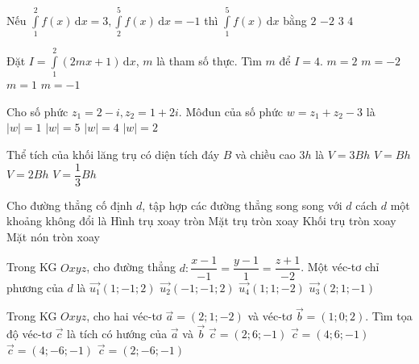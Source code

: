 \begin{ex}%
	Nếu $\displaystyle\int\limits_1^2 f(x)\mathrm{\,d}x=3,\displaystyle\int\limits_2^5 f(x)\mathrm{\,d}x=-1$ thì $\displaystyle\int\limits_1^5 f(x)\mathrm{\,d}x$ bằng
	\choice
	{\True $2$}
	{$-2$}
	{$3$}
	{$4$}
	\loigiai{
	\[\displaystyle\int\limits_1^5 f(x)\mathrm{\,d}x=\displaystyle\int\limits_1^2 f(x)\mathrm{\,d}x+\displaystyle\int\limits_2^5 f(x)\mathrm{\,d}x=3-1=2.\]}
\end{ex}
\begin{ex}%
	Đặt $I=\displaystyle\int\limits_1^2(2mx+1)\mathrm{\,d}x$, $m$ là tham số thực. Tìm $m$ để $I=4$. 
	\choice
	{$m=2$}
	{$m=-2$}
	{\True $m=1$}
	{$m=-1$}
	\loigiai{
	\[I=\displaystyle\int\limits_1^2(2mx+1)\mathrm{\,d}x=\left(mx^2+x\right)\bigg|_1^2 =4m+2-m-1=3m+1 \Rightarrow I=4\Leftrightarrow m=1.\]}
\end{ex}
\begin{ex}%
	Cho số phức $z_1=2-i, z_2=1+2i$. Môđun của số phức $w=z_1+z_2-3$ là
	\choice
	{\True $|w|=1$}
	{$|w|=5$}
	{$|w|=4$}
	{$|w|=2$}
\end{ex}
\begin{ex}%
	Thể tích của khối lăng trụ có diện tích đáy $B$ và chiều cao $3h$ là
	\choice
	{\True $V=3Bh$}
	{$V=Bh$}
	{$V=2Bh$}
	{$V=\dfrac{1}{3}Bh$}
\end{ex}
\begin{ex}%
	Cho đường thẳng cố định $d$, tập hợp các đường thẳng song song với $d$ cách $d$ một khoảng không đổi là
	\choice
	{Hình trụ xoay tròn}
	{\True Mặt trụ tròn xoay}
	{Khối trụ tròn xoay}
	{Mặt nón tròn xoay}
\end{ex}
\begin{ex}%
	Trong KG $Oxyz$, cho đường thẳng $d\colon\dfrac{x-1}{-1}=\dfrac{y-1}{1}=\dfrac{z+1}{-2}$. Một véc-tơ chỉ phương của $d$ là 
	\choice
	{\True $\overrightarrow{u_1}(1;-1; 2)$}
	{$\overrightarrow{u_2}(-1;-1; 2)$}
	{$\overrightarrow{u_4}(1; 1;-2)$}
	{$\overrightarrow{u_3}(2; 1;-1)$}
\end{ex}
\begin{ex}%
	Trong KG $Oxyz$, cho hai véc-tơ $\overrightarrow{a}=(2; 1;-2)$ và véc-tơ $\overrightarrow{b}=(1; 0; 2)$. Tìm tọa độ véc-tơ $\overrightarrow{c}$ là tích có hướng của $\overrightarrow{a}$ và $\overrightarrow{b}$ 
	\choice
	{$\overrightarrow{c}=(2; 6;-1)$}
	{$\overrightarrow{c}=(4; 6;-1)$}
	{$\overrightarrow{c}=(4;-6;-1)$}
	{\True $\overrightarrow{c}=(2;-6;-1)$}
\end{ex}
